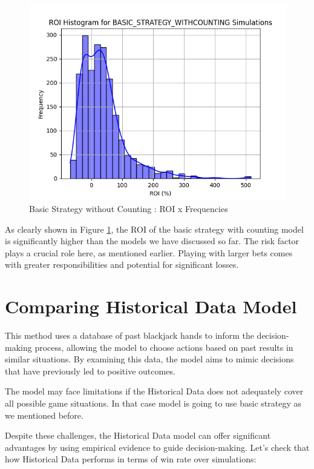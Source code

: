 \documentclass[a4paper,12pt]{report}
\begin{document}
\begin{figure}[h]
\begin{center}
\includegraphics[scale=0.5]{figures/graphs/bsc_roi.png}
\end{center}
\caption{Basic Strategy without Counting : ROI x Frequencies}
\label{fig:bsc_roi}
\end{figure}

As clearly shown in Figure \ref{fig:bsc_roi}, the ROI of the basic strategy with counting model is significantly higher than the models we have discussed so far. The risk factor plays a crucial role here, as mentioned earlier. Playing with larger bets comes with greater responsibilities and potential for significant losses.

\section{Comparing Historical Data Model}
This method uses a database of past blackjack hands to inform the decision-making process, allowing the model to choose actions based on past results in similar situations. By examining this data, the model aims to mimic decisions that have previously led to positive outcomes.

The model may face limitations if the Historical Data does not adequately cover all possible game situations. In that case model is going to use basic strategy as we mentioned before.

Despite these challenges, the Historical Data model can offer significant advantages by using empirical evidence to guide decision-making. Let's check that how Historical Data performs in terms of win rate over simulations:
\end{document}
